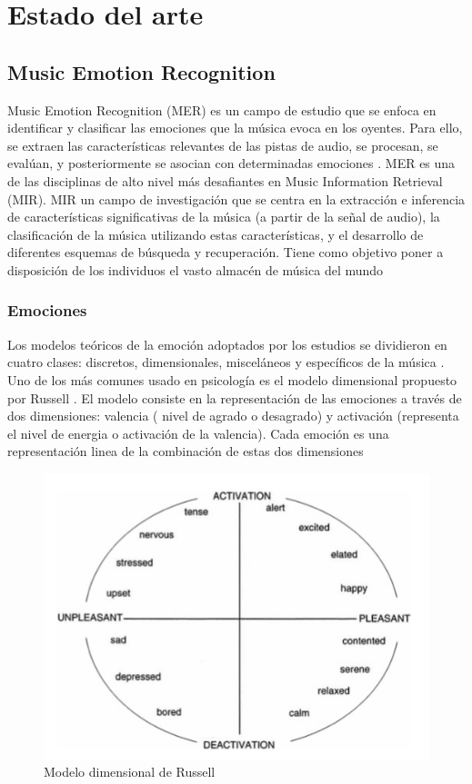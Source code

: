 \documentclass[12pt,a4paper,Spanish]{article}
\begin{document}
\newpage
\section{Estado del arte}
\subsection{Music Emotion Recognition}

Music Emotion Recognition (MER) es un campo de estudio que se enfoca en identificar y clasificar las emociones que la música evoca en los oyentes. Para ello, se extraen las características relevantes de las pistas de audio, se procesan, se evalúan, y posteriormente se asocian con determinadas emociones \cite{GomezCanon2021SPM}.
\newline
MER es una de las disciplinas de alto nivel más desafiantes en Music Information Retrieval (MIR). MIR un campo de investigación que se centra en la extracción e inferencia de características significativas de la música (a partir de la señal de audio), la clasificación de la música utilizando estas características, y el desarrollo de diferentes esquemas de búsqueda y recuperación. Tiene como objetivo poner a disposición de los individuos el vasto almacén de música del mundo \cite{schedl2014music}

\subsubsection{Emociones}\label{emo}

Los modelos teóricos de la emoción adoptados por los estudios se dividieron en cuatro clases: discretos, dimensionales, misceláneos y específicos de la música \cite{eerola2012review}. 
\newline
Uno de los más comunes usado en psicología es el modelo dimensional propuesto por Russell \cite{posner2005circumplex}. El modelo consiste en la representación de las emociones a través de dos dimensiones: valencia ( nivel de agrado o desagrado) y activación (representa el nivel de energia o activación de la valencia). Cada emoción es una representación linea de la combinación de estas dos dimensiones

\begin{figure}[H]
	\centering
	\includegraphics[width=0.7\linewidth]{figs/russell}
	\caption{Modelo dimensional de Russell}
	\label{fig:russell}
\end{figure}
\end{document}
